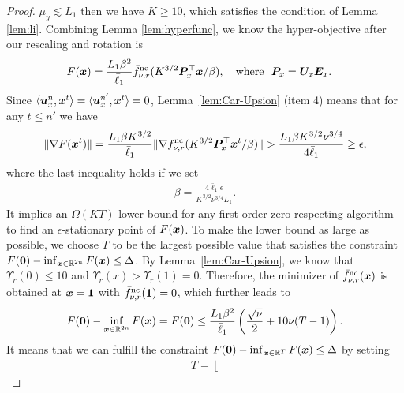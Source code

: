 \begin{proof}
$\mu_y \lesssim L_1$ then we have $K \ge 10$, which satisfies the condition of Lemma \ref{lem:li}. Combining Lemma \ref{lem:hyperfunc}, we know the hyper-objective after our rescaling and rotation is
\begin{align} \label{eq:varphi-ncsc}
     F(\vx) &= \frac{L_1 \beta^2}{\bar \ell_1} \bar f^{\rm nc}_{\nu, r}(K^{3/2} \mP_x^\top \vx/ \beta), \quad {\rm where} ~~ \mP_x = \mU_x \mE_x.   %
\end{align}
Since $\langle {\bm{u}}_x^n, {\bm{x}}^t \rangle = \langle {\bm{u}}_x^{n'}, {\bm{x}}^{t} \rangle = 0$, Lemma~\ref{lem:Car-Upsion} (item 4) means that for any $t \le n'$ we have 
\begin{align} \label{eq:varphi-grad}
    \Vert \nabla F({\bm{x}}^t) \Vert = \frac{L_1 \beta K^{3/2}}{\bar \ell_1} \Vert \nabla f^{\rm nc}_{\nu, r}(K^{3/2} {\bm{P}}_x^\top {\bm{x}}^t / \beta) \Vert >  \frac{L_1 \beta K^{3/2} \nu^{3/4}}{4 \bar \ell_1} \ge \epsilon,
\end{align}
where the last inequality holds if we set 
\begin{align} \label{eq:para-beta}
     \beta = \frac{4 \bar \ell_1 \epsilon}{K^{3/2} \nu^{3/4} L_1}.
\end{align}
It implies an $\Omega(K T)$ lower bound for any first-order zero-respecting algorithm to find an $\epsilon$-stationary point of $F({\bm{x}})$. To make the lower bound as large as possible, we choose $T$ to be the largest possible value that satisfies the constraint $F({\bm{0}}) - \inf_{{\bm{x}} \in {\mathbb{R}}^{2n}} F({\bm{x}}) \le \Delta$. By Lemma~\ref{lem:Car-Upsion}, we know that $\Upsilon_r(0) \le 10$ and  $\Upsilon_r(x) > \Upsilon_r(1) =0$. Therefore, the minimizer of $\bar f^{\rm nc}_{\nu, r}({\bm{x}})$ is obtained at ${\bm{x}}  ={\bm{1}}$ with $\bar f_{\nu, r}^{\rm nc}({\bm{1}}) = 0$, which further leads to
\begin{align} \label{eq:Delta}
    F({\bm{0}}) - \inf_{{\bm{x}} \in {\mathbb{R}}^{2n}} F({\bm{x}}) = F({\bm{0}}) \le \frac{L_1 \beta^2}{\bar \ell_1} \left( \frac{\sqrt{\nu}}{2} + 10 \nu (T-1) \right).
\end{align} 
It means that we can fulfill the constraint $F({\bm{0}}) - \inf_{{\bm{x}} \in {\mathbb{R}}^{T}} F({\bm{x}}) \le \Delta$ by setting
\begin{align} \label{eq:para-T}
    T = \left \lfloor 

\end{align}
\end{proof}
